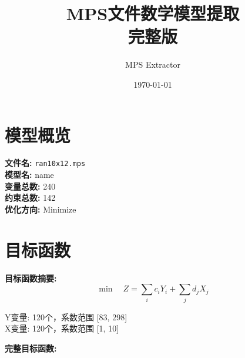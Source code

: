 \documentclass[a4paper,10pt]{article}
\title{MPS文件数学模型提取\\{\large 完整版}}
\author{MPS Extractor}
\date{\today}
\begin{document}
\maketitle
\tableofcontents
\newpage

\section{模型概览}

\textbf{文件名:} \texttt{ran10x12.mps} \\
\textbf{模型名:} name \\
\textbf{变量总数:} 240 \\
\textbf{约束总数:} 142 \\
\textbf{优化方向:} Minimize \\

\section{目标函数}

\textbf{目标函数摘要:}
\begin{equation}
\min \quad Z = \sum_{i} c_i Y_i + \sum_{j} d_j X_j
\end{equation}

Y变量: 120个，系数范围 [83, 298] \\
X变量: 120个，系数范围 [1, 10]

\textbf{完整目标函数:}
\end{document}
